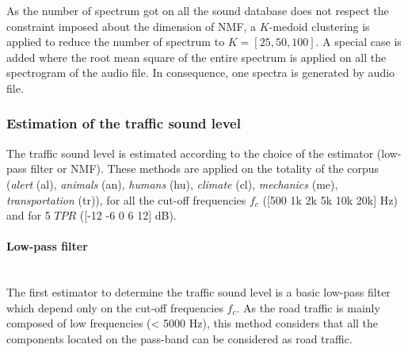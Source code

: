 \documentclass[twocolumn,a4paper,10pt]{article}
\begin{document}
As the number of spectrum got on all the sound database does not respect the constraint imposed about the dimension of NMF, a $K$-medoid clustering is applied to reduce the number of spectrum to $K = \left[ 25, 50, 100 \right]$. A special case is added where the root mean square of the entire spectrum is applied on all the spectrogram of the audio file. In consequence, one spectra is generated by audio file. 

\subsubsection{Estimation of the traffic sound level}
The traffic sound level is estimated according to the choice of the estimator (low-pass filter or NMF). These methods are applied on the totality of the corpus (\textit{alert} (al), \textit{animals} (an), \textit{humans} (hu), \textit{climate} (cl), \textit{mechanics} (me), \textit{transportation} (tr)), for all the cut-off frequencies $f_c$ ([500 1k 2k 5k 10k 20k] Hz) and for 5 $TPR$ ([-12 -6 0 6 12] dB).

\paragraph{Low-pass filter}\mbox{} \\
The first estimator to determine the traffic sound level is a basic low-pass filter which depend only on the cut-off frequencies $f_c$. As the road traffic is mainly composed of low frequencies (< 5000 Hz), this method considers that all the components located on the pass-band can be considered as road traffic. 
\end{document}
